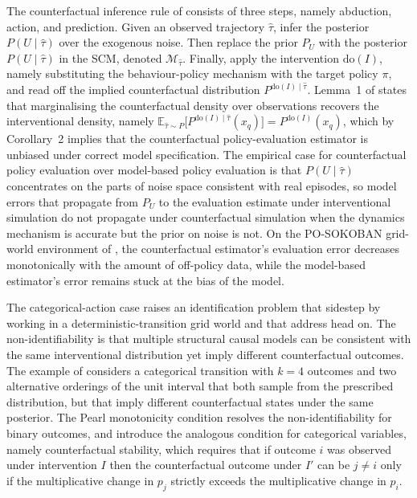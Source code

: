 The counterfactual inference rule of \citet{Buesing2019} consists of three steps,
namely abduction, action, and prediction. Given an observed trajectory
$\hat\tau$, infer the posterior $P(U \mid \hat\tau)$ over the exogenous noise.
Then replace the prior $P_U$ with the posterior $P(U \mid \hat\tau)$ in the SCM,
denoted $\mathcal M_{\hat\tau}$. Finally, apply the intervention
$\mathrm{do}(I)$, namely substituting the behaviour-policy mechanism with the
target policy $\pi$, and read off the implied counterfactual distribution
$P^{\mathrm{do}(I) \mid \hat\tau}$. Lemma~1 of \citet{Buesing2019} states that
marginalising the counterfactual density over observations recovers the
interventional density, namely
$\mathbb E_{\hat\tau \sim P}\bigl[ P^{\mathrm{do}(I) \mid \hat\tau}(x_q) \bigr]
= P^{\mathrm{do}(I)}(x_q)$,
which by Corollary~2 implies that the counterfactual policy-evaluation estimator
is unbiased under correct model specification. The empirical case for
counterfactual policy evaluation over model-based policy evaluation is that
$P(U \mid \hat\tau)$ concentrates on the parts of noise space consistent with
real episodes, so model errors that propagate from $P_U$ to the evaluation
estimate under interventional simulation do not propagate under counterfactual
simulation when the dynamics mechanism is accurate but the prior on noise is
not. On the PO-SOKOBAN grid-world environment of \citet{Buesing2019}, the
counterfactual estimator's evaluation error decreases monotonically with the
amount of off-policy data, while the model-based estimator's error remains
stuck at the bias of the model.

The categorical-action case raises an identification problem that
\citet{Buesing2019} sidestep by working in a deterministic-transition grid world
and that \citet{Oberst2019} address head on. The non-identifiability is that
multiple structural causal models can be consistent with the same interventional
distribution yet imply different counterfactual outcomes. The example of
\citet{Oberst2019} considers a categorical transition with $k = 4$ outcomes and
two alternative orderings of the unit interval that both sample from the
prescribed distribution, but that imply different counterfactual states under
the same posterior. The Pearl monotonicity condition resolves the
non-identifiability for binary outcomes, and \citet{Oberst2019} introduce the
analogous condition for categorical variables, namely counterfactual stability,
which requires that if outcome $i$ was observed under intervention $I$ then the
counterfactual outcome under $I'$ can be $j \ne i$ only if the multiplicative
change in $p_j$ strictly exceeds the multiplicative change in $p_i$.

